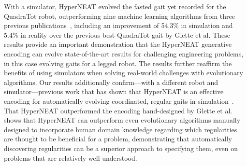 
With a simulator, HyperNEAT evolved the fasted gait yet recorded for the QuadraTot robot, outperforming nine machine learning algorithms from three previous publications~\cite{yos:clune,glette,haocheng}, including an improvement of 54.3\% in simulation and 5.4\% in reality over the previous best QuadraTot gait by Glette et al. These results provide an important demonstration that the HyperNEAT generative encoding can evolve state-of-the-art results for challenging engineering problems, in this case evolving gaits for a legged robot. The results further reaffirm the benefits of using simulators when solving real-world challenges with evolutionary algorithms. Our results additionally confirm---with a different robot and simulator---previous work that has shown that HyperNEAT is an effective encoding for automatically evolving coordinated, regular gaits in simulation~\cite{clune2009evolving,clune2011performance,yos:clune}. That HyperNEAT outperformed the encoding hand-designed by Glette et al. shows that HyperNEAT can outperform even evolutionary algorithms manually designed to incorporate human domain knowledge regarding which regularities are thought to be beneficial for a problem, demonstrating that automatically discovering regularities can be a superior approach to specifying them, even on problems that are relatively well understood. 
